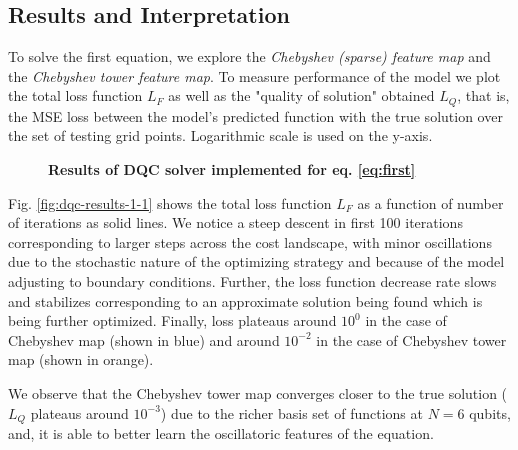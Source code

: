 \documentclass[11pt,a4paper]{article}
\begin{document}
{\subsection{Results and Interpretation}

To solve the first equation, we explore the \textit{Chebyshev (sparse) feature map} and the \textit{Chebyshev tower feature map}. To measure performance of the model we plot the total loss function $L_F$ as well as the "quality of solution" obtained $L_Q$, that is, the MSE loss between the model's predicted function with the true solution over the set of testing grid points. Logarithmic scale is used on the y-axis.
\begin{figure}[H]
    \centering
    \caption{\textbf{Results of DQC solver implemented for eq. \ref{eq:first}}}
    \label{fig:dqc-results-1}
\end{figure}

Fig. \ref{fig:dqc-results-1-1} shows the total loss function $L_F$ as a function of number of iterations as solid lines. We notice a steep descent in first 100 iterations corresponding to larger steps across the cost landscape, with minor oscillations due to the stochastic nature of the optimizing strategy and because of the model adjusting to boundary conditions. Further, the loss function decrease rate slows and stabilizes corresponding to an approximate solution being found which is being further optimized. Finally, loss plateaus around $10^0$ in the case of Chebyshev map (shown in blue) and around $10^{-2}$ in the case of Chebyshev tower map (shown in orange).

We observe that the Chebyshev tower map converges closer to the true solution ($L_Q$ plateaus around $10^{-3}$) due to the richer basis set of functions at $N = 6$ qubits, and, it is able to better learn the oscillatoric features of the equation.

}
\end{document}

